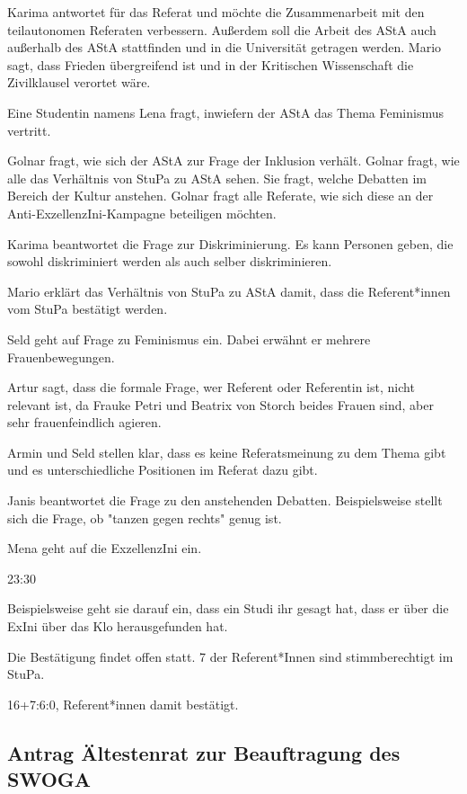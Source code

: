 \documentclass[ngerman,headheight=70pt]{scrartcl}
\begin{document}
    Karima antwortet für das Referat und möchte die Zusammenarbeit mit den
    teilautonomen Referaten verbessern. Außerdem soll die Arbeit des AStA
    auch außerhalb des AStA stattfinden und in die Universität getragen werden.
    Mario sagt, dass Frieden übergreifend ist und in der Kritischen Wissenschaft
    die Zivilklausel verortet wäre.

    Eine Studentin namens Lena fragt, inwiefern der AStA das Thema
    Feminismus vertritt.

    Golnar fragt, wie sich der AStA zur Frage der Inklusion verhält. Golnar fragt,
    wie alle das Verhältnis von StuPa zu AStA sehen. Sie fragt, welche Debatten
    im Bereich der Kultur anstehen. Golnar fragt alle Referate, wie sich diese
    an der Anti-ExzellenzIni-Kampagne beteiligen möchten.

    Karima beantwortet die Frage zur Diskriminierung. Es kann Personen geben,
    die sowohl diskriminiert werden als auch selber diskriminieren.

    Mario erklärt das Verhältnis von StuPa zu AStA damit, dass die Referent*innen
    vom StuPa bestätigt werden.

    Seld geht auf Frage zu Feminismus ein. Dabei erwähnt er mehrere
    Frauenbewegungen.

    Artur sagt, dass die formale Frage, wer Referent oder Referentin ist,
    nicht relevant ist, da Frauke Petri und Beatrix von Storch beides Frauen sind,
    aber sehr frauenfeindlich agieren.

    Armin und Seld stellen klar, dass es keine Referatsmeinung zu dem
    Thema gibt und es unterschiedliche Positionen im Referat dazu gibt.

    Janis beantwortet die Frage zu den anstehenden Debatten. Beispielsweise
    stellt sich die Frage, ob "tanzen gegen rechts" genug ist.

    Mena geht auf die ExzellenzIni ein.

    23:30

    Beispielsweise geht sie darauf ein, dass ein Studi ihr gesagt hat, dass
    er über die ExIni über das Klo herausgefunden hat.

    Die Bestätigung findet offen statt. 7 der Referent*Innen sind stimmberechtigt
    im StuPa.

    16+7:6:0, Referent*innen damit bestätigt.

    \subsection{Antrag Ältestenrat zur Beauftragung des SWOGA}
\end{document}
